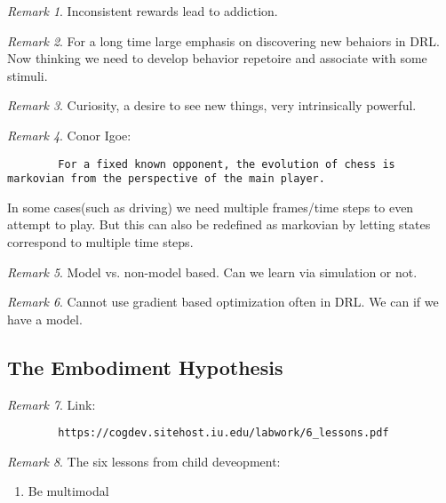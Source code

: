 \documentclass[11pt]{article}
\theoremstyle{remark}
\newtheorem{remark}{Remark}
\begin{document}
\begin{remark}
	Inconsistent rewards lead to addiction.
\end{remark}

\begin{remark}
	For a long time large emphasis on discovering new behaiors in DRL. Now thinking we need to develop behavior repetoire and associate with some stimuli.
\end{remark}

\begin{remark}
	Curiosity, a desire to see new things, very intrinsically powerful.
\end{remark}

\begin{remark}
	Conor Igoe: 
	\begin{verbatim}
		For a fixed known opponent, the evolution of chess is markovian from the perspective of the main player.
	\end{verbatim}

	In some cases(such as driving) we need multiple frames/time steps to even attempt to play. But this can also be redefined as markovian by letting states correspond to multiple time steps.
\end{remark}

\begin{remark}
	Model vs. non-model based. Can we learn via simulation or not.
\end{remark}

\begin{remark}
	Cannot use gradient based optimization often in DRL. We can if we have a model.
\end{remark}

\subsection{The Embodiment Hypothesis}

\begin{remark}
	Link:
	\begin{verbatim}
		https://cogdev.sitehost.iu.edu/labwork/6_lessons.pdf
	\end{verbatim}
\end{remark}

\begin{remark}
	The six lessons from child deveopment:
	\begin{enumerate}
		\item Be multimodal
	\end{enumerate}
\end{remark}
\end{document}
